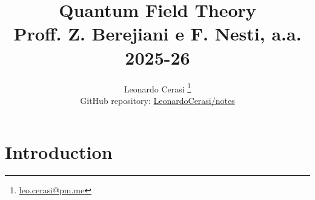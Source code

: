 \documentclass[a4paper, 12pt]{book}
\title{\Huge\textbf{Quantum Field Theory} \\ \large Proff. Z. Berejiani e F. Nesti, a.a. 2025-26}
\author{Leonardo Cerasi%
	\thanks{\scriptsize\href{mailto:leo.cerasi@pm.me}{leo.cerasi@pm.me}} \\
	\small GitHub repository: \href{https://github.com/LeonardoCerasi/notes}{LeonardoCerasi/notes}}
\date{}
\begin{document}
\frontmatter

\maketitle

\toc

\pagestyle{contents}

\mainmatter

\pagestyle{introd}
\chapter{Introduction}

\end{document}
